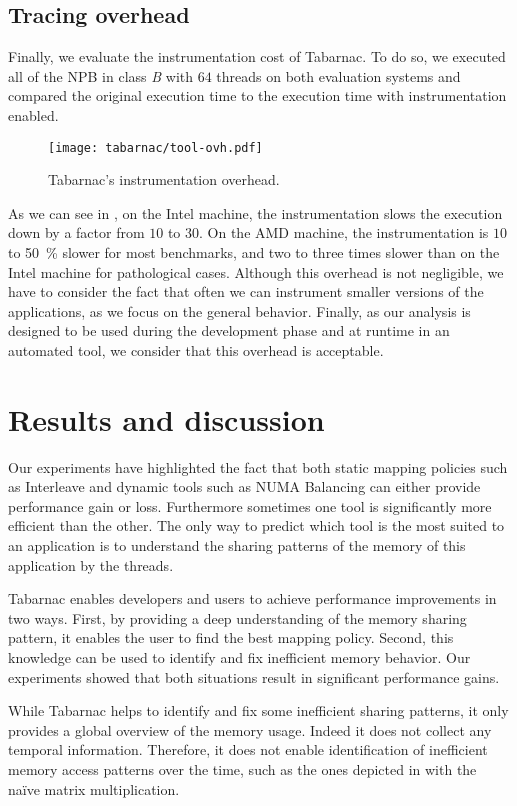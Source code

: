 \subsection{Tracing overhead}

Finally,  we evaluate the instrumentation cost of \gls{Tabarnac}.
To do so, we executed all of the \gls{NPB} in class \emph{B} with $64$ threads on both evaluation systems and compared the original execution time to the execution time with instrumentation enabled.

\begin{figure}[htb]
    \centering
    \texttt{[image: tabarnac/tool-ovh.pdf]}
    \caption{Tabarnac's instrumentation overhead.}
    \label{fig:ovh-tabarnac}
\end{figure}

As we can see in , on the Intel machine, the instrumentation slows the execution down by a factor from $10$ to $30$.
On the \gls{AMD} machine, the instrumentation is $10$ to \SI{50}{\%} slower for most benchmarks, and two to three times slower than on the \gls{Intel} machine for pathological cases.
Although this overhead is not negligible, we have to consider the fact that often we can instrument smaller versions of the applications, as we focus on the general behavior.
Finally, as our analysis is designed to be used during the development phase and at runtime in an automated tool, we consider that this overhead is acceptable.


\section{Results and discussion}
\label{sec:tab-cncl}

Our experiments have highlighted the fact that both static mapping policies such as Interleave and dynamic tools such as \gls{NUMA} Balancing can either provide performance gain or loss.
Furthermore sometimes one tool is significantly more efficient than the other.
The only way to predict which tool is the most suited to an application is to understand the sharing patterns of the memory of this application by the threads.

\gls{Tabarnac} enables developers and users to achieve performance improvements in two ways.
First, by providing a deep understanding of the memory sharing pattern, it enables the user to find the best mapping policy.
Second, this knowledge can be used to identify and fix inefficient memory behavior.
Our experiments showed that both situations result in significant performance gains.

While \gls{Tabarnac} helps to identify and fix some inefficient sharing patterns, it only provides a global overview of the memory usage.
Indeed it does not collect any temporal information.
Therefore, it does not enable identification of inefficient memory access patterns over the time, such as the ones depicted in  with the naïve matrix multiplication.

